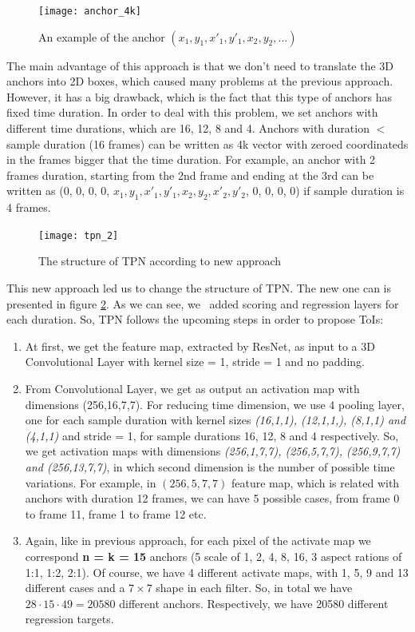 \begin{figure}[h]
  \centering
  \texttt{[image: anchor\_4k]}
  \caption{An example of the anchor $(x_1,y_1,x'_1,y'_1,x_2,y_2, ...)$}
  \label{fig:anchor_4k}
\end{figure}

The main advantage of this approach is that we don't need to translate the 3D anchors into 2D boxes, which caused many problems at the previous approach.
However, it has a big drawback, which is the fact that this type of anchors has fixed time duration.
In order to deal with this problem, we set anchors with different time durations, which are 16, 12, 8 and 4.
Anchors with duration $ < $ sample duration (16 frames) can be written as 4k vector with zeroed coordinateds in the frames bigger that the time duration. For example, an anchor with
2 frames duration, starting from the 2nd frame and ending at the 3rd can be written as (0, 0, 0, 0, $x_1, y_1, x'_1, y'_1, x_2, y_2, x'_2, y'_2$, 0, 0, 0, 0) if sample
duration is 4 frames. 

\begin{figure}[h]
  \centering
  \texttt{[image: tpn\_2]}
  \caption{The structure of TPN according to new approach}
  \label{fig:New_structure}
\end{figure}

This new approach led us to change the structure of TPN. The new one can is presented in figure \ref{fig:New_structure}. As we can see, we \
added scoring and regression layers for each duration. So, TPN follows the upcoming steps in order to propose ToIs:
\begin{enumerate}
\item At first, we get the feature map, extracted by ResNet, as input to a 3D Convolutional Layer with kernel size = 1, stride = 1 and no padding.
\item From Convolutional Layer, we get as output an activation map with dimensions (256,16,7,7). For reducing time dimension, we use 4 pooling layer,
  one for each sample duration with kernel sizes \textit{(16,1,1), (12,1,1,), (8,1,1) and (4,1,1)} and stride = 1,  for sample durations 16, 12, 8 and 4 respectively.
  So, we get activation maps with dimensions \textit{(256,1,7,7), (256,5,7,7), (256,9,7,7) and (256,13,7,7)}, in which second dimension is the number of possible
  time variations. For example, in $(256,5,7,7)$ feature map, which is related with anchors with duration 12 frames, we can have 5 possible cases, from frame 0 to frame
  11, frame 1 to frame 12 etc.
  
\item Again, like in previous approach, for each pixel of the activate map we correspond \textbf{n = k = 15}
  anchors (5 scale of 1, 2, 4, 8, 16, 3 aspect rations of  1:1, 1:2, 2:1). Of course, we have 4 different activate maps, with 1, 5, 9 and 13
  different cases and a $7 \times 7$ shape in each filter. So, in total we have $28 \cdot 15 \cdot 49 = 20580$ different anchors.
  Respectively, we have 20580 different regression targets.

\end{enumerate}

